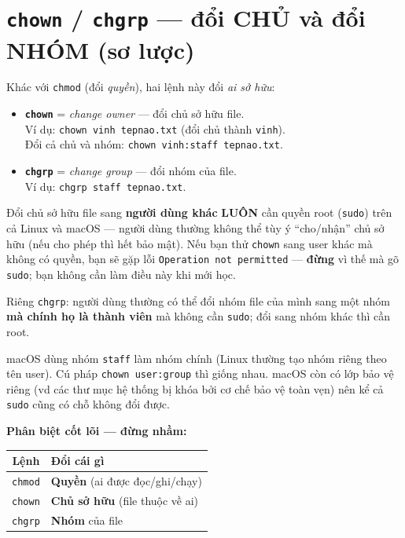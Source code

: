 \documentclass[12pt,a4paper]{article}
\newcommand{\cmd}[1]{\texttt{#1}}
\begin{document}
\section{\texttt{chown} / \texttt{chgrp} --- đổi CHỦ và đổi NHÓM (sơ lược)}

Khác với \cmd{chmod} (đổi \textit{quyền}), hai lệnh này đổi \textit{ai sở hữu}:

\begin{itemize}
\item \textbf{\cmd{chown}} = \textit{change owner} --- đổi chủ sở hữu file. \\
  Ví dụ: \cmd{chown vinh tepnao.txt} (đổi chủ thành \cmd{vinh}). \\
  Đổi cả chủ và nhóm: \cmd{chown vinh:staff tepnao.txt}.
\item \textbf{\cmd{chgrp}} = \textit{change group} --- đổi nhóm của file. \\
  Ví dụ: \cmd{chgrp staff tepnao.txt}.
\end{itemize}

\begin{warnbox}
Đổi chủ sở hữu file sang \textbf{người dùng khác} \textbf{LUÔN} cần quyền root
(\cmd{sudo}) trên cả Linux và macOS --- người dùng thường không thể tùy ý ``cho/nhận''
chủ sở hữu (nếu cho phép thì hết bảo mật). Nếu bạn thử \cmd{chown} sang user khác mà
không có quyền, bạn sẽ gặp lỗi \cmd{Operation not permitted} --- \textbf{đừng} vì thế
mà gõ \cmd{sudo}; bạn không cần làm điều này khi mới học.

Riêng \cmd{chgrp}: người dùng thường có thể đổi nhóm file của mình sang một nhóm
\textbf{mà chính họ là thành viên} mà không cần \cmd{sudo}; đổi sang nhóm khác thì
cần root.
\end{warnbox}

\begin{notebox}
macOS dùng nhóm \cmd{staff} làm nhóm chính (Linux thường tạo nhóm riêng theo tên
user). Cú pháp \cmd{chown user:group} thì giống nhau. macOS còn có lớp bảo vệ riêng
(vd các thư mục hệ thống bị khóa bởi cơ chế bảo vệ toàn vẹn) nên kể cả \cmd{sudo}
cũng có chỗ không đổi được.
\end{notebox}

\textbf{Phân biệt cốt lõi --- đừng nhầm:}

\begin{center}
\begin{tabular}{|c|>{\raggedright\arraybackslash}p{8cm}|}
\hline
\rowcolor{tablehead}\textbf{Lệnh} & \textbf{Đổi cái gì} \\
\hline
\cmd{chmod} & \textbf{Quyền} (ai được đọc/ghi/chạy) \\
\hline
\cmd{chown} & \textbf{Chủ sở hữu} (file thuộc về ai) \\
\hline
\cmd{chgrp} & \textbf{Nhóm} của file \\
\hline
\end{tabular}
\end{center}
\end{document}
